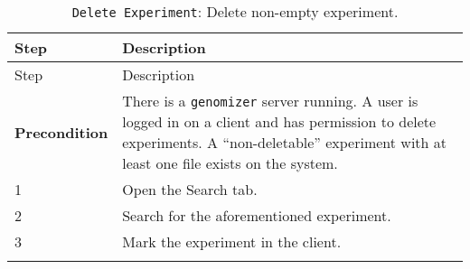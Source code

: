 \begin{longtable}[c]{@{}ll@{}}
\caption{\texttt{Delete\ Experiment}: Delete non-empty
experiment.}\tabularnewline
\toprule
\begin{minipage}[b]{0.31\columnwidth}\raggedright\strut
Step
\strut\end{minipage} &
\begin{minipage}[b]{0.63\columnwidth}\raggedright\strut
Description
\strut\end{minipage}\tabularnewline
\midrule
\endfirsthead
\toprule
\begin{minipage}[b]{0.31\columnwidth}\raggedright\strut
Step
\strut\end{minipage} &
\begin{minipage}[b]{0.63\columnwidth}\raggedright\strut
Description
\strut\end{minipage}\tabularnewline
\midrule
\endhead
\begin{minipage}[t]{0.31\columnwidth}\raggedright\strut
\textbf{Precondition}
\strut\end{minipage} &
\begin{minipage}[t]{0.63\columnwidth}\raggedright\strut
There is a \texttt{genomizer} server running. A user is logged in on a
client and has permission to delete experiments. A ``non-deletable''
experiment with at least one file exists on the system.
\strut\end{minipage}\tabularnewline
\begin{minipage}[t]{0.31\columnwidth}\raggedright\strut
1
\strut\end{minipage} &
\begin{minipage}[t]{0.63\columnwidth}\raggedright\strut
Open the Search tab.
\strut\end{minipage}\tabularnewline
\begin{minipage}[t]{0.31\columnwidth}\raggedright\strut
2
\strut\end{minipage} &
\begin{minipage}[t]{0.63\columnwidth}\raggedright\strut
Search for the aforementioned experiment.
\strut\end{minipage}\tabularnewline
\begin{minipage}[t]{0.31\columnwidth}\raggedright\strut
3
\strut\end{minipage} &
\begin{minipage}[t]{0.63\columnwidth}\raggedright\strut
Mark the experiment in the client.
\strut\end{minipage}\tabularnewline
\begin{minipage}[t]{0.31\columnwidth}\raggedright\strut

\end{minipage}
\end{longtable}
